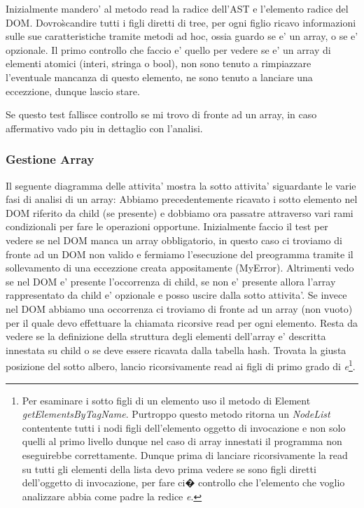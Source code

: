 \documentclass[11pt,titlepage,a4paper,twoside,openany]{book}
\begin{document}
Inizialmente mandero' al metodo read la radice dell'AST e l'elemento radice del DOM.
Dovro\` scandire tutti i figli diretti di tree, per ogni figlio ricavo informazioni sulle sue caratteristiche tramite metodi ad hoc, ossia guardo se e' un array, o se e' opzionale.
Il primo controllo che faccio e' quello per vedere se e' un array di elementi atomici (interi, stringa o bool), non sono tenuto a rimpiazzare l'eventuale mancanza di questo elemento, ne sono tenuto a lanciare una eccezzione, dunque lascio stare.

Se questo test fallisce controllo se mi trovo di fronte ad un array, in caso affermativo vado piu in dettaglio con l'analisi.
\subsubsection{Gestione Array}
Il seguente diagramma delle attivita' mostra la sotto attivita' siguardante le varie fasi di analisi di un array:
Abbiamo precedentemente ricavato i sotto elemento nel DOM riferito da child (se presente) e dobbiamo ora passatre attraverso vari rami condizionali per fare le operazioni opportune.
Inizialmente faccio il test per vedere se nel DOM manca un array obbligatorio, in questo caso ci troviamo di fronte ad un DOM non valido e fermiamo l'esecuzione del preogramma tramite il sollevamento di una eccezzione creata appositamente (MyError).
Altrimenti vedo se nel DOM e' presente l'occorrenza di child, se non e' presente allora l'array rappresentato da child e' opzionale e posso uscire dalla sotto attivita'.
Se invece nel DOM abbiamo una occorrenza ci troviamo di fronte ad un array (non vuoto) per il quale devo effettuare la chiamata ricorsive read per ogni elemento.
Resta da vedere se la definizione della struttura degli elementi dell'array e' descritta innestata su child o se deve essere ricavata dalla tabella hash.
Trovata la giusta posizione del sotto albero, lancio ricorsivamente read ai figli di primo grado di \textit{e}\footnote[1]{Per esaminare i sotto figli di un elemento uso il metodo di Element \textit{getElementsByTagName}. 
Purtroppo questo metodo ritorna un \textit{NodeList} contentente tutti i nodi figli dell'elemento oggetto di invocazione e non solo quelli al primo livello dunque nel caso di array innestati il programma non eseguirebbe correttamente.
Dunque prima di lanciare ricorsivamente la read su tutti gli elementi della lista devo prima vedere se sono figli diretti dell'oggetto di invocazione, per fare ci� controllo che l'elemento che voglio analizzare abbia come padre la redice \textit{e}.}.
\end{document}

